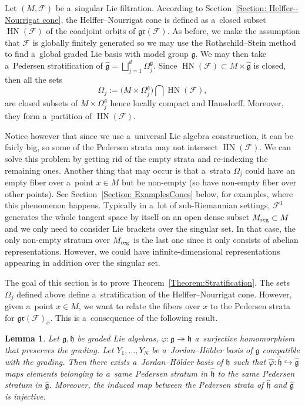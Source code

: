 \documentclass[10pt,a4paper]{article}
\newcommand{\F}{\mathcal{F}} %
\newcommand{\g}{\mathfrak{g}} %
\newcommand{\HN}{\operatorname{HN}} %
\newcommand{\Fb}{\mathcal{F}} %
\newcommand{\gr}{\mathfrak{gr}} %
\numberwithin{equation}{section}
\newtheorem{lem}[thm]{Lemma}
\theoremstyle{definition}
\begin{document}
Let $(M,\Fb)$ be a~singular Lie filtration. According to Section~\ref{Section: Helffer--Nourrigat cone}, the Helffer--Nourrigat cone is defined as a~closed subset $\HN(\Fb)$ of the coadjoint orbits of $\gr(\Fb)$. As before, we make the assumption that $\Fb$ is globally finitely generated so we may use the Rothschild--Stein method to find a~global graded Lie basis with model group $\g$. We may then take a~Pedersen stratification of $\widehat{\g} = \bigsqcup_{j=1}^d\Omega_j^{\g}$. Since $\HN(\Fb) \subset M\times \widehat{\g}$ is closed, then all the sets
\[
\Omega_j := \bigl(M\times\Omega_j^{\g}\bigr)\bigcap \HN(\Fb),
\]
are closed subsets of $M \times \Omega_j^{\g}$ hence locally compact and Hausdorff. Moreover, they form a~partition of $\HN(\Fb)$.

Notice however that since we use a~universal Lie algebra construction, it can be fairly big, so some of the Pedersen strata may not intersect $\HN(\Fb)$. We can solve this problem by getting rid of the empty strata and re-indexing the remaining ones. Another thing that may occur is that a~strata $\Omega_j$ could have an empty fiber over a~point $x \in M$ but be non-empty (so have non-empty fiber over other points). See Section~\ref{Section: ExamplesCones} below, for examples, where this phenomenon happens. Typically in a~lot of sub-Riemannian settings, $\F^1$ generates the whole tangent space by itself on an open dense subset $M_{\rm reg}\subset M$ and we only need to consider Lie brackets over the singular set. In that case, the only non-empty stratum over $M_{\rm reg}$ is the last one since it only consists of abelian representations. However, we could have infinite-dimensional representations appearing in addition over the singular set.

The goal of this section is to prove Theorem~\ref{Theorem:Stratification}. The sets $\Omega_j$ defined above define a~stratification of the Helffer--Nourrigat cone. However, given a~point $x \in M$, we want to relate the fibers over $x$ to the Pedersen strata for $\gr(\Fb)_x$. This is a~consequence of the following result.

\begin{lem}
 Let $\g,\mathfrak{h}$ be graded Lie algebras, $\varphi\colon \g\twoheadrightarrow\mathfrak{h}$ a~surjective homomorphism that preserves the grading. Let $Y_1, \dots, Y_N$ be a~Jordan--H\"older basis of $\g$ compatible with the grading. Then there exists a~Jordan--H\"older basis of $\mathfrak{h}$ such that $\widehat{\varphi} \colon \widehat{\mathfrak{h}} \hookrightarrow \widehat{\g}$ maps elements belonging to a~same Pedersen stratum in $\widehat{\mathfrak{h}}$ to the same Pedersen stratum in $\widehat{\g}$. Moreover, the induced map between the Pedersen strata of $\widehat{\mathfrak{h}}$ and $\widehat{\g}$ is injective.
\end{lem}
\end{document}
